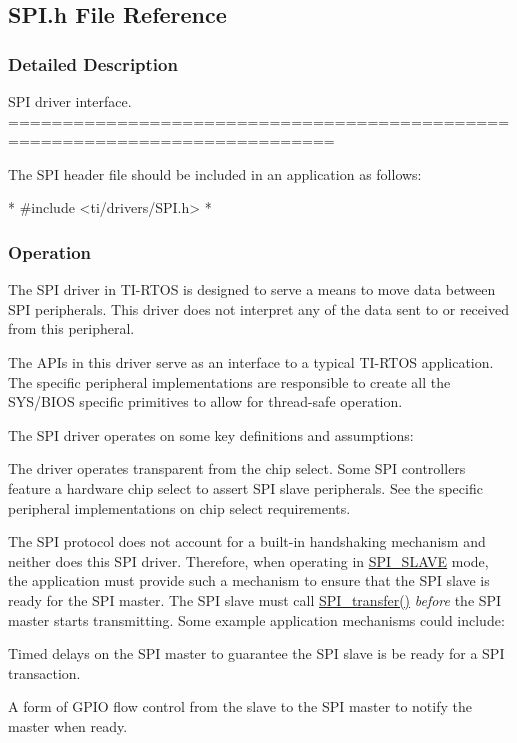 \subsection{S\-P\-I.\-h File Reference}
\label{_s_p_i_8h}


\subsubsection{Detailed Description}
S\-P\-I driver interface. ============================================================================

The S\-P\-I header file should be included in an application as follows\-: 
\begin{DoxyCode}
*  #include <ti/drivers/SPI.h>
*  
\end{DoxyCode}


\subsubsection*{Operation}

The S\-P\-I driver in T\-I-\/\-R\-T\-O\-S is designed to serve a means to move data between S\-P\-I peripherals. This driver does not interpret any of the data sent to or received from this peripheral.

The A\-P\-Is in this driver serve as an interface to a typical T\-I-\/\-R\-T\-O\-S application. The specific peripheral implementations are responsible to create all the S\-Y\-S/\-B\-I\-O\-S specific primitives to allow for thread-\/safe operation.

The S\-P\-I driver operates on some key definitions and assumptions\-:
\begin{DoxyItemize}
\item The driver operates transparent from the chip select. Some S\-P\-I controllers feature a hardware chip select to assert S\-P\-I slave peripherals. See the specific peripheral implementations on chip select requirements.
\item The S\-P\-I protocol does not account for a built-\/in handshaking mechanism and neither does this S\-P\-I driver. Therefore, when operating in \hyperlink{_s_p_i_8h_a60a7e3d74577b38aa79ea6983362f942abc98c1546fe12d3fceb1f86cf670faa9}{S\-P\-I\-\_\-\-S\-L\-A\-V\-E} mode, the application must provide such a mechanism to ensure that the S\-P\-I slave is ready for the S\-P\-I master. The S\-P\-I slave must call \hyperlink{_s_p_i_8h_a989e17f96b54fcc3dc2cac5f8ac6bdb2}{S\-P\-I\-\_\-transfer()} {\itshape before} the S\-P\-I master starts transmitting. Some example application mechanisms could include\-:
\begin{DoxyItemize}
\item Timed delays on the S\-P\-I master to guarantee the S\-P\-I slave is be ready for a S\-P\-I transaction.
\item A form of G\-P\-I\-O flow control from the slave to the S\-P\-I master to notify the master when ready.
\end{DoxyItemize}
\end{DoxyItemize}

